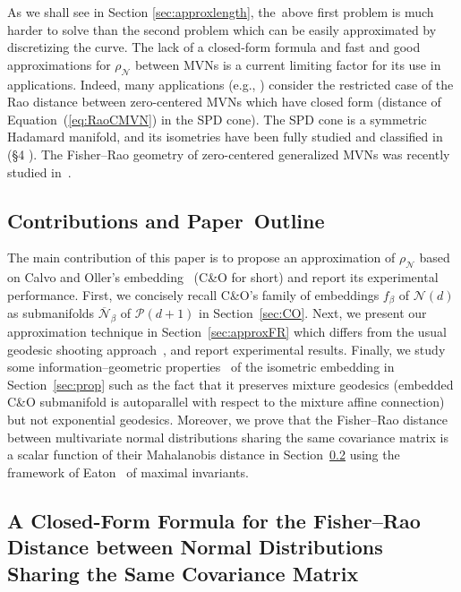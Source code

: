 \documentclass[entropy,article,accept,oneauthor,pdftex,entropy]{Definitions/mdpi}
\def\barN{{\overline{\mathcal{N}}}}
\def\calN{\mathcal{N}}
\def\calP{\mathcal{P}}
\begin{document}
As we shall see in {Section} %
 \ref{sec:approxlength}, the~above first problem is much harder to solve than the second problem which can be easily approximated by discretizing the curve. 
The lack of a closed-form formula and fast and good approximations for $\rho_{\calN}$ between MVNs is a current limiting factor for its use in applications. 
Indeed, many applications (e.g., \cite{Sra-2016,nguyen2021geomnet}) consider the restricted case of the Rao distance between zero-centered MVNs which have closed form (distance of Equation~(\ref{eq:RaoCMVN}) in the SPD cone). 
The SPD cone is a symmetric Hadamard manifold, and its isometries have been fully studied and classified in~\cite{SPDisometries-2018} (\S{4}%
).
The Fisher–Rao geometry of zero-centered generalized MVNs was recently studied in~\cite{verdoolaege2012geometry}.



\subsection{Contributions and Paper~Outline}
The main contribution of this paper is to propose an approximation of $\rho_{\calN}$ based on Calvo and Oller's embedding~\cite{SDPMVN-1990}  (C\&O for short) and report its experimental performance.
First, we concisely recall C\&O's family of embeddings $f_\beta$ of $\calN(d)$ as submanifolds $\barN_\beta$ of $\calP(d+1)$ in Section~\ref{sec:CO}.
Next, we present our approximation technique in Section~\ref{sec:approxFR}  which differs from the usual geodesic shooting approach~\cite{MVNGeodesicShooting-2014}, and report experimental results.
Finally, we study some information–geometric properties~\cite{IG-2016} of the isometric embedding in {Section}~\ref{sec:prop} such as the fact that it preserves mixture geodesics (embedded C\&O submanifold is autoparallel with respect to the mixture affine connection) but not exponential geodesics.
Moreover, we prove that the Fisher–Rao distance between multivariate normal distributions sharing the same covariance matrix is a scalar function of their Mahalanobis distance in {Section}~\ref{sec:FRsamecovar} using the framework of Eaton~\cite{eaton1989group} of maximal invariants.

\subsection{A Closed-Form Formula for the Fisher–Rao Distance between Normal Distributions Sharing the Same Covariance Matrix}\label{sec:FRsamecovar}
\end{document}
